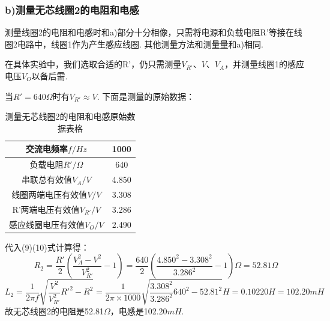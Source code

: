 \documentclass[UTF8]{ctexart}
\begin{document}
\subsubsection*{b)测量无芯线圈2的电阻和电感}
测量线圈2的电阻和电感时和a)部分十分相像，只需将电源和负载电阻R'等接在线圈2电路中，线圈1作为产生感应线圈. 其他测量方法和测量量和a)相同.\par
在具体实验中，我们选取合适的R'，仍只需测量$V_{R'}$、$V$、$V_A$，并测量线圈1的感应电压$V_O$以备后需. \par
当$R'=640\Omega$时有$V_{R'}\approx V$. 下面是测量的原始数据：
\begin{table}[H]\begin{center}
    \caption{测量无芯线圈2的电阻和电感原始数据表格}
    \begin{tabular}{|c|c|}
        \hline
        交流电频率$f/Hz$&1000\\
        \hline
        负载电阻$R'/\Omega$&640\\
        \hline
        串联总有效值$V_A/V$&4.850\\
        \hline
        线圈两端电压有效值$V/V$&3.308\\
        \hline
        R'两端电压有效值$V_{R'}/V$&3.286\\
        \hline
        感应线圈电压有效值$V_O/V$&2.490\\
        \hline
        \end{tabular}
\end{center}\end{table}
代入(9)(10)式计算得：
\[R_2=\frac{R'}{2}(\frac{V_A^2-V^2}{V_{R'}^2}-1)
=\frac{640}{2}(\frac{4.850^2-3.308^2}{3.286^2}-1)\Omega=52.81\Omega
\]
\[L_2=\frac{1}{2\pi f}\sqrt{\frac{V^2}{V_{R'}^2}R'^2-R^2}
=\frac{1}{2\pi\times 1000}\sqrt{\frac{3.308^2}{3.286^2}640^2-52.81^2}H=0.10220H=102.20mH
\]
故无芯线圈2的电阻是52.81$\Omega$，电感是102.20$mH$.
\end{document}
